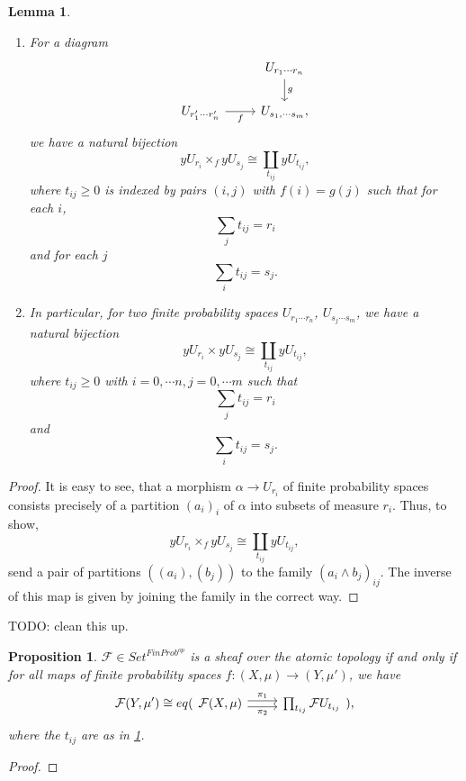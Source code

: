 \documentclass[a4paper]{amsproc}
\theoremstyle{plain}
\newtheorem{proposition}[theorem]{Proposition}
\newtheorem{lemma}[theorem]{Lemma}
\theoremstyle{definition}
\theoremstyle{remark}
\numberwithin{equation}{section}
\begin{document}
\begin{lemma} \label{multipullback}
\begin{enumerate}
We have the following universal properties \footnote{In \cite{caramello_lafforgue} families of objects with these universal properties are called multilimits, see lemma 6.11.} :
\item For a diagram
\[
\begin{tikzcd}
& U_{r_1\cdots r_n} \arrow[d, "g"] \\
U_{r'_1 \cdots r'_{n}} \arrow[r, "f"'] & U_{s_1,\cdots s_m} ,
\end{tikzcd}
\]
we have a natural bijection
\[
y U_{r_i} \times_f y U_{s_j} \cong \coprod_{t_{ij}} y U_{t_{ij}} ,
\]
where $t_{ij} \geq 0$ is indexed by pairs $(i, j)$ with $f(i) = g(j)$ such that for each $i$,
\[
\sum_j t_{ij} = r_i
\]
and for each $j$
\[
\sum_i t_{ij} = s_j .
\]

\item In particular, for two finite probability spaces $U_{r_1\cdots r_n}$, $U_{s_j\cdots s_m}$, we have a natural bijection
\[
y U_{r_i} \times y U_{s_j} \cong \coprod_{t_{ij}} y U_{t_{ij}} ,
\]
where $t_{ij} \geq 0$ with $i = 0, \cdots n, j = 0, \cdots m$ such that
\[
\sum_j t_{ij} = r_i
\]
and
\[
\sum_i t_{ij} = s_j .
\]
\end{enumerate}
\end{lemma}
\begin{proof}
It is easy to see, that a morphism $\alpha \to U_{r_i}$ of finite probability spaces consists precisely of a partition $(a_i)_i$ of $\alpha$ into subsets of measure $r_i$. Thus, to show,
\[
y U_{r_i} \times_f y U_{s_j} \cong \coprod_{t_{ij}} y U_{t_{ij}} ,
\]
send a pair of partitions $((a_i),(b_j))$ to the family $(a_i \wedge b_j)_{ij}$. The inverse of this map is given by joining the family in the correct way.
\end{proof}

TODO: clean this up.
\begin{proposition} \label{sheaf_condition}
$\mathcal{F} \in Set^{FinProb^{op}}$ is a sheaf over the atomic topology if and only if for all maps of finite probability spaces $f: (X,\mu) \to (Y,\mu')$, we have
\[
\mathcal{F} (Y,\mu') \cong eq(\begin{tikzcd}
\mathcal{F} (X,\mu) \arrow[r, "\pi_1", shift left] \arrow[r, "\pi_2"', shift right] & \prod_{t_{ij}} \mathcal{F} U_{t_{ij}}
\end{tikzcd} ),
\]
where the $t_{ij}$ are as in \ref{multipullback}.
\end{proposition}
\begin{proof}

\end{proof}
\end{document}
